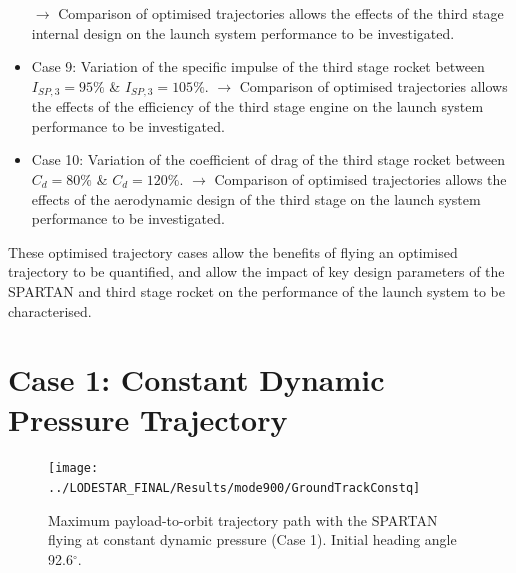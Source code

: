\begin{itemize}
	\newline$\rightarrow$ Comparison of optimised trajectories allows the effects of the third stage internal design on the launch system performance to be investigated. 
	\item Case 9: Variation of the specific impulse of the third stage rocket between $I_{SP,3} = 95\%$ \& $I_{SP,3} = 105\%$. 
	\newline$\rightarrow$ Comparison of optimised trajectories allows the effects of the efficiency of the third stage engine on the launch system performance to be investigated. 
	\item Case 10: Variation of the coefficient of drag of the third stage rocket between $C_d = 80\%$ \& $C_d = 120\%$.
	\newline$\rightarrow$ Comparison of optimised trajectories allows the effects of the aerodynamic design of the third stage on the launch system performance to be investigated.
\end{itemize}
These optimised trajectory cases allow the benefits of flying an optimised trajectory to be quantified, and allow the impact of key design parameters of the SPARTAN and third stage rocket on the performance of the launch system to be characterised. 
  

\section{Case 1: Constant Dynamic Pressure Trajectory}


\begin{figure}[ht]
	\centering
	\texttt{[image: ../LODESTAR\_FINAL/Results/mode900/GroundTrackConstq]}
	\caption{Maximum payload-to-orbit trajectory path with the SPARTAN flying at constant dynamic pressure (Case 1). Initial heading angle 92.6$^\circ$.}
	\label{fig:GroundTrackConstq}
\end{figure}

